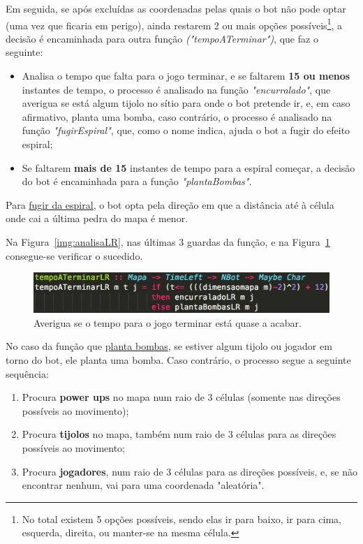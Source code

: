 \documentclass[a4paper]{article}
\begin{document}
Em seguida, se após excluídas as coordenadas pelas quais o bot não pode optar (uma vez que ficaria em 
perigo), ainda restarem 2 ou mais opções possíveis\footnote{No total existem 5 opções possíveis, sendo elas
  ir para baixo, ir para cima, esquerda, direita, ou manter-se na mesma célula.}, a decisão é encaminhada
para outra função \emph{("tempoATerminar")}, que faz o seguinte:

\begin{itemize}
	\item Analisa o tempo que falta para o jogo terminar, e se faltarem \textbf{15 ou menos} instantes
	de tempo, o processo é analisado na função \emph{"encurralado"}, que averigua se
	está algum tijolo no sítio para onde o bot pretende ir, e, em caso afirmativo, planta uma bomba, caso
	contrário, o processo é analisado na função \emph{"fugirEspiral"}, que, como o nome indica, ajuda o bot 
	a fugir do efeito espiral;
	\item Se faltarem \textbf{mais de 15} instantes de tempo para a espiral começar, a decisão do bot
	é encaminhada para a função \emph{"plantaBombas"}.
\end{itemize}

Para \underline{fugir da espiral}, o bot opta pela direção em que a distância até à célula onde cai a
última pedra do mapa é menor.

Na Figura~\ref{img:analisaLR}, nas últimas 3 guardas da função, e na Figura~\ref{img:tempoATerminarLR}
consegue-se verificar o sucedido.

\begin{figure}[H]
\centering 
\includegraphics[scale=0.50]{tempoATerminarLR}
\caption{Averigua se o tempo para o jogo terminar está quase a acabar.}
\label{img:tempoATerminarLR}
\end{figure}

No caso da função que \underline{planta bombas}, se estiver algum tijolo ou jogador em torno do bot, 
ele planta uma bomba. Caso contrário, o processo segue a seguinte sequência:

\begin{enumerate} 
	\item Procura \textbf{power ups} no mapa num raio de 3 células (somente nas direções 
	possíveis ao movimento);
	\item Procura \textbf{tijolos} no mapa, também num raio de 3 células para as direções 
	possíveis ao movimento;
	\item Procura \textbf{jogadores}, num raio de 3 células para as direções possíveis, e, 
	se não encontrar nenhum, vai para uma coordenada "aleatória".
\end{enumerate}
\end{document}
